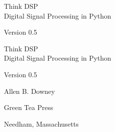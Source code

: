 \documentclass[12pt]{book}
\newcommand{\theversion}{0.5}
\begin{document}
\begin{latexonly}

\renewcommand{\blankpage}{\thispagestyle{empty} \quad \newpage}


\thispagestyle{empty}

\begin{flushright}
\vspace*{2.0in}

\begin{spacing}{3}
{\huge Think DSP}\\
{\Large Digital Signal Processing in Python}
\end{spacing}

\vspace{0.25in}

Version \theversion

\vfill

\end{flushright}


\blankpage
\blankpage

\pagebreak
\thispagestyle{empty}

\begin{flushright}
\vspace*{2.0in}

\begin{spacing}{3}
{\huge Think DSP}\\
{\Large Digital Signal Processing in Python}
\end{spacing}

\vspace{0.25in}

Version \theversion

\vspace{1in}


{\Large
Allen B. Downey\\
}


\vspace{0.5in}

{\Large Green Tea Press}

{\small Needham, Massachusetts}

\vfill

\end{flushright}


\pagebreak
\thispagestyle{empty}


\end{latexonly}
\end{document}

